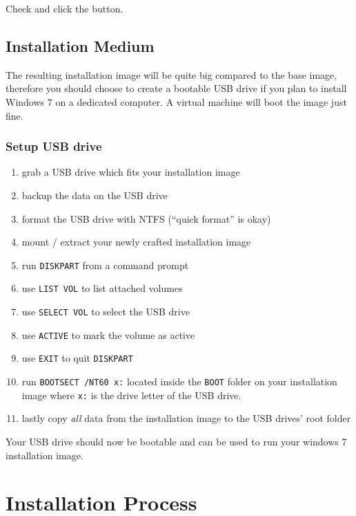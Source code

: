 \documentclass{itsarticle}
\begin{document}
Check  and click the
 button.

\subsection{Installation Medium}
\label{sub:medium}

The resulting installation image will be quite big compared to the base image,
therefore you should choose to create a bootable USB drive if you plan to
install Windows 7 on a dedicated computer. A virtual machine will boot the
image just fine.

\subsubsection{Setup USB drive}

\begin{enumerate}
    \item grab a USB drive which fits your installation image
    \item backup the data on the USB drive
    \item format the USB drive with NTFS (``quick format'' is okay)
    \item mount / extract your newly crafted installation image
    \item run \texttt{DISKPART} from a command prompt
    \item use \texttt{LIST VOL} to list attached volumes
    \item use \texttt{SELECT VOL} to select the USB drive
    \item use \texttt{ACTIVE} to mark the volume as active
    \item use \texttt{EXIT} to quit \texttt{DISKPART}
    \item run \texttt{BOOTSECT /NT60 x:} located inside the \texttt{BOOT}
        folder on your installation image where \texttt{x:} is the drive letter
        of the USB drive.
    \item lastly copy \emph{all} data from the installation image to the USB
        drives' root folder
\end{enumerate}

Your USB drive should now be bootable and can be used to run your windows 7
installation image.

\section{Installation Process}
\label{sec:installation}
\end{document}

